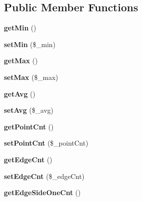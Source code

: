 \subsection*{Public Member Functions}
\begin{DoxyCompactItemize}
\item 
\mbox{\label{class_reversi_anz_a8404d3eedbf6483ec27f13f64f9df3b1}} 
{\bfseries get\+Min} ()
\item 
\mbox{\label{class_reversi_anz_a6567c1122f96ec079b2f64f887e3543f}} 
{\bfseries set\+Min} (\$\+\_\+min)
\item 
\mbox{\label{class_reversi_anz_abeb2912350107c52d5320b68beaceae7}} 
{\bfseries get\+Max} ()
\item 
\mbox{\label{class_reversi_anz_a31a31b0d815ac3f3e26a67310269282a}} 
{\bfseries set\+Max} (\$\+\_\+max)
\item 
\mbox{\label{class_reversi_anz_a62d13c383b8902de0b1f1f76d4b3b4d9}} 
{\bfseries get\+Avg} ()
\item 
\mbox{\label{class_reversi_anz_a430a846117accd844d205cb8bbc4b1f1}} 
{\bfseries set\+Avg} (\$\+\_\+avg)
\item 
\mbox{\label{class_reversi_anz_a86da928704556cffeb9eb19b1020beff}} 
{\bfseries get\+Point\+Cnt} ()
\item 
\mbox{\label{class_reversi_anz_aa9f4140eed7e8d282ddf617def3c3c70}} 
{\bfseries set\+Point\+Cnt} (\$\+\_\+point\+Cnt)
\item 
\mbox{\label{class_reversi_anz_ac54bb2c81080ef8d6ae1ce1cf0f108bd}} 
{\bfseries get\+Edge\+Cnt} ()
\item 
\mbox{\label{class_reversi_anz_a83947131d9c16ac8d0368234fbc273d7}} 
{\bfseries set\+Edge\+Cnt} (\$\+\_\+edge\+Cnt)
\item 
\mbox{\label{class_reversi_anz_a1376e55e83fd05a9e29ca173425967f8}} 
{\bfseries get\+Edge\+Side\+One\+Cnt} ()

\end{DoxyCompactItemize}
